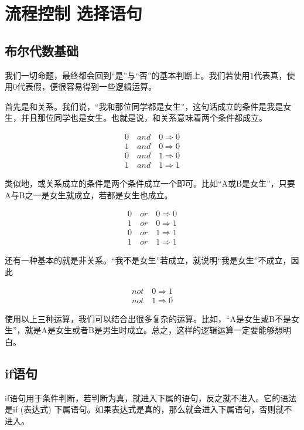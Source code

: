 \section{流程控制 选择语句}

\subsection{布尔代数基础}

我们一切命题，最终都会回到“是”与“否”的基本判断上。我们若使用1代表真，使用0代表假，便很容易得到一些逻辑运算。

首先是和关系。我们说，“我和那位同学都是女生”，这句话成立的条件是我是女生，并且那位同学也是女生。也就是说，和关系意味着两个条件都成立。

\begin{align*}
    0\quad and\quad 0 \Rightarrow 0\\
    1\quad and\quad 0 \Rightarrow 0\\
    0\quad and\quad 1 \Rightarrow 0\\
    1\quad and\quad 1 \Rightarrow 1
\end{align*}

类似地，或关系成立的条件是两个条件成立一个即可。比如“A或B是女生”，只要A与B之一是女生就成立，若都是女生也成立。

\begin{align*}
    0\quad or\quad 0 \Rightarrow 0\\
    1\quad or\quad 0 \Rightarrow 1\\
    0\quad or\quad 1 \Rightarrow 1\\
    1\quad or\quad 1 \Rightarrow 1
\end{align*}

还有一种基本的就是非关系。“我不是女生”若成立，就说明“我是女生”不成立，因此

\begin{align*}
    not\quad 0 \Rightarrow 1\\
    not\quad 1 \Rightarrow 0 
\end{align*}

使用以上三种运算，我们可以结合出很多复杂的运算。比如，“A是女生或B不是女生”，就是A是女生或者B是男生时成立。总之，这样的逻辑运算一定要能够想明白。

\subsection{if语句}

if语句用于条件判断，若判断为真，就进入下属的语句，反之就不进入。它的语法是if (表达式) 下属语句。如果表达式是真的，那么就会进入下属语句，否则就不进入。

